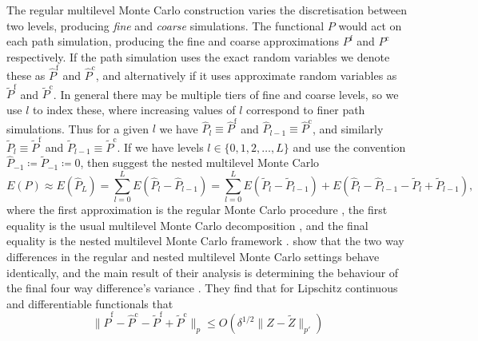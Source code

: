 \documentclass[manuscript,review]{acmart}
\begin{document}
The regular multilevel Monte Carlo construction varies the discretisation between two levels, producing \emph{fine} and \emph{coarse} simulations. The functional $ P $ would act on each path simulation, producing the fine and coarse approximations $ P^{\mathrm{f}} $ and $ P^{\mathrm{c}} $ respectively. If the path simulation uses the exact random variables we denote these as $ \widehat{P}^{\mathrm{f}} $ and $ \widehat{P}^{\mathrm{c}} $, and alternatively if it uses approximate random variables as $ \widetilde{P}^{\mathrm{f}} $ and $ \widetilde{P}^{\mathrm{c}} $. In general there may be multiple tiers of fine and coarse levels, so we use $ l $ to index these, where increasing values of $ l $ correspond to finer path simulations. Thus for a given $ l $ we have $ \widehat{P}_l \equiv \widehat{P}^{\mathrm{f}} $ and $ \widehat{P}_{l-1} \equiv \widehat{P}^{\mathrm{c}} $, and similarly $ \widetilde{P}_l \equiv \widetilde{P}^{\mathrm{f}} $ and $ \widetilde{P}_{l-1} \equiv \widetilde{P}^{\mathrm{c}} $. If we have levels $ l \in \{0, 1, 2, \ldots, L\} $ and use the convention $ \widehat{P}_{-1} \coloneqq \widetilde{P}_{-1} \coloneqq 0 $, then \citet{giles2020approximate} suggest the nested multilevel Monte Carlo
\begin{equation*}
E(P) 
\approx
E(\widehat{P}_L) 
= 
\sum_{l = 0}^{L} E(\widehat{P}_l - \widehat{P}_{l-1}) 
= 
\sum_{l = 0}^{L} E(\widetilde{P}_l - \widetilde{P}_{l-1}) +  E(\widehat{P}_l - \widehat{P}_{l-1} - \widetilde{P}_l + \widetilde{P}_{l-1}),
\end{equation*}
where the first approximation is the regular Monte Carlo procedure \citep{glasserman2013monte}, the first equality is the usual multilevel Monte Carlo decomposition \citep{giles2008multilevel}, and the final equality is the nested multilevel Monte Carlo framework \citep{giles2020approximate,sheridan2020nested}.
\citeauthor{giles2020approximate} \citep{giles2020approximate,sheridan2020nested} show that the two way differences in the regular and nested multilevel Monte Carlo settings behave identically, and the main result of their analysis is determining the behaviour of the final four way difference's variance \citep[lemmas~4.10 and 4.11]{giles2020approximate} \citep[corollaries~6.2.6.2 and 6.2.6.3]{sheridan2020nested}. They find that for Lipschitz continuous and differentiable functionals that 
\begin{equation*}
\lVert \widehat{P}^{\mathrm{f}} - \widehat{P}^{\mathrm{c}} - \widetilde{P}^{\mathrm{f}} + \widetilde{P}^{\mathrm{c}}\rVert_p 
\leq O(\delta^{1/2} \lVert Z - \widetilde{Z} \rVert_{p'}) 
\end{equation*}
\end{document}

